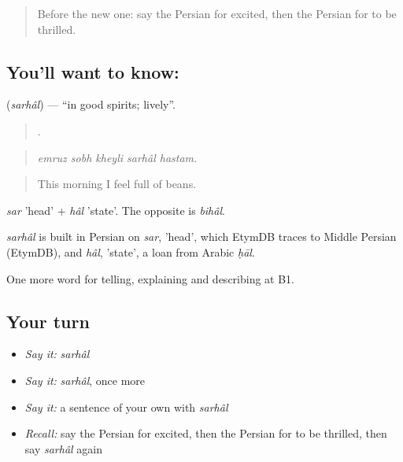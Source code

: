 \label{lesson:FA-C486-sarhal}



\begin{quote}
Before the new one: say the Persian for excited, then the Persian for to be thrilled.
\end{quote}

\subsection*{You'll want to know: }
\textbf{} (\emph{sarhâl}) — \textquotedblleft{}in good spirits; lively\textquotedblright{}.

\begin{quote}
    .
\end{quote}

\begin{quote}
\emph{emruz sobh kheyli sarhâl hastam.}
\end{quote}

\begin{quote}
This morning I feel full of beans.
\end{quote}

\emph{sar} 'head' + \emph{hâl} 'state'. The opposite is \emph{bihâl}.

\begin{cousinweb}
\emph{sarhâl} is built in Persian on \emph{sar}, 'head', which EtymDB traces to Middle Persian (EtymDB), and \emph{hâl}, 'state', a loan from Arabic \emph{ḥāl}.
\end{cousinweb}

\begin{grammarlens}[title={What you've built}]
One more word for telling, explaining and describing at B1.
\end{grammarlens}

\subsection*{Your turn}
\begin{itemize}
\raggedright
  \item \emph{Say it:} \emph{sarhâl}
  \item \emph{Say it:} \emph{sarhâl}, once more
  \item \emph{Say it:} a sentence of your own with \emph{sarhâl}
  \item \emph{Recall:} say the Persian for excited, then the Persian for to be thrilled, then say \emph{sarhâl} again
\end{itemize}

